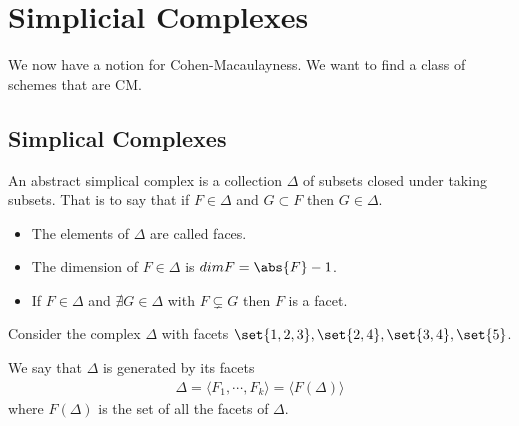 \newpage
\section{Simplicial Complexes}

We now have a notion for Cohen-Macaulayness. We want to find a class of schemes that are CM.

\subsection{Simplical Complexes}

\begin{definition}
    An abstract simplical complex is a collection $\Delta $ of subsets closed under taking subsets. That is to say that if $F \in \Delta$ and $G \subset F$ then $G \in \Delta$.
    \begin{itemize}
        \item The elements of $\Delta$ are called faces.
        \item The dimension of $F \in \Delta$ is $dim F = \abs{F} - 1$.
        \item If $F \in \Delta$ and $\nexists G \in \Delta $ with $F \subsetneq G $ then $F$ is a facet.
    \end{itemize}
\end{definition}

\begin{example}
    Consider the complex $\Delta$ with facets $\set{1,2,3}, \set{2,4}, \set{3,4} , \set{5}$.

    \begin{center}
    \end{center}
\end{example}

\begin{definition}
    We say that $\Delta$ is generated by its facets
    \begin{align*}
        \Delta = \langle F_1 , \cdots , F_k\rangle = \langle F(\Delta)\rangle
    \end{align*}
    where $F(\Delta) $ is the set of all the facets of $\Delta$.
\end{definition}

